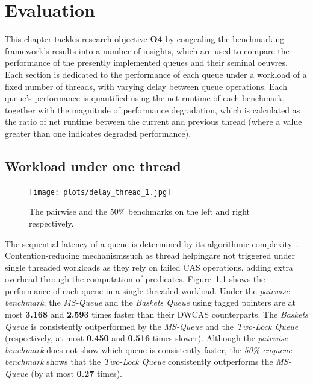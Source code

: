 \chapter{Evaluation\label{chap:evaluation}}
This chapter tackles research objective \textbf{O4} by congealing the
benchmarking framework's results into a number of insights, which are used to
compare the performance of the presently implemented queues and their seminal oeuvres. 
Each section is dedicated to the performance of each
queue under a workload of a fixed number of threads, with varying
delay between queue operations.
Each queue's performance is quantified using the net runtime of each benchmark,
together with the magnitude of performance degradation, which is
calculated as the ratio of net runtime between the current and previous thread
(where a value greater than one indicates degraded performance).

\section{Workload under one thread}

\begin{figure}[!ht]
    \texttt{[image: plots/delay\_thread\_1.jpg]}
    \caption{The pairwise and the 50\% benchmarks on the left and right respectively.}
    \label{fig:perf_1_thread}
\end{figure}

The sequential latency of a queue is determined by its algorithmic
complexity~\citep{valois1995datastructures}. Contention-reducing
mechanisms\textemdash such as thread helping\textemdash are not triggered under
single threaded workloads as they rely on failed CAS operations, adding
extra overhead through the computation of predicates.
Figure~\ref{fig:perf_1_thread} shows the performance of each queue in a single
threaded workload. Under the \emph{pairwise benchmark}, the \emph{MS-Queue} and
the \emph{Baskets Queue} using tagged pointers are at most \textbf{3.168} and
\textbf{2.593} times faster than their DWCAS counterparts. 
The \emph{Baskets Queue} is consistently outperformed by the \emph{MS-Queue}
and the \emph{Two-Lock Queue} (respectively, at most \textbf{0.450} and
\textbf{0.516} times slower). Although the \emph{pairwise benchmark} does not
show which queue is consistently faster, the \emph{50\% enqueue benchmark}
shows that the \emph{Two-Lock Queue} consistently outperforms the
\emph{MS-Queue} (by at most \textbf{0.27} times).

